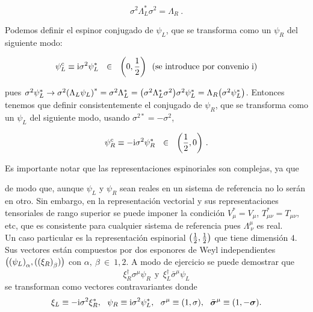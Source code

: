 \begin{equation}
    \sigma^{2}\Lambda_{L}^{*}\sigma^{2}=\Lambda_{R}~.
\end{equation}

Podemos definir el espinor conjugado de $\psi_{L}$, que se transforma como un $\psi_{R}$ del siguiente modo:

\begin{equation}
    \psi_{L}^{c} \equiv \mathrm{i} \sigma^{2}\psi_{L}^{*} ~~\in ~~\qty(0,\frac{1}{2}) ~~\text{(se introduce por convenio $\mathrm{i}$)}
\end{equation}

pues $\sigma^{2}\psi_{L}^{*} \to \sigma^{2}\qty(\Lambda_{L} \psi_{L})^{*} = \sigma^{2} \Lambda_{L}^{*}  = \qty(\sigma^{2} \Lambda_{L}^{*} \sigma^{2}) \sigma^{2} \psi_{L}^{*} =  \Lambda_{R}\qty( \sigma^{2} \psi_{L}^{*})$. Entonces tenemos que definir consistentemente el conjugado de $\psi_R$, que se transforma como un $\psi_{L}$ del siguiente modo, usando $\sigma^{2*}=-\sigma^{2}$,

\begin{equation}
    \psi_{R}^{c} \equiv -\mathrm{i} \sigma^{2} \psi^{*}_{R}~~\in ~~\qty(\frac{1}{2},0)~.
\end{equation}

Es importante notar que las representaciones espinoriales son complejas, ya que

de modo que, aunque $\psi_L$ y $\psi_{R}$ sean reales en un sistema de referencia no lo serán en otro. Sin embargo, en la representación vectorial y sus representaciones tensoriales de rango superior se puede imponer la condición $V_{\mu}^{*} = V_{\mu}$, $T_{\mu \nu}^{*} = T_{\mu \nu}$, etc, que es consistente para cualquier sistema de referencia pues $\Lambda^{\mu}_{~\nu}$ es real.\\

Un caso particular es la representación espinorial $\qty(\frac{1}{2},\frac{1}{2})$ que tiene dimensión $4$. Sus vectores están compuestos por dos esponores de Weyl independientes $\qty\big(\qty(\psi_{L})_{\alpha},(\qty(\xi_{R})_{\beta} ))$ con $\alpha,~\beta~ \in~{1,2}$. A modo de ejercicio se puede demostrar que 
\begin{equation*}
    \xi^{\dagger}_{R}\sigma^{\mu}\psi_{R}~~\text{y}~~\xi^{\dagger}_{L} \bar{\sigma}^{\mu}\psi_{L}
\end{equation*}
se transforman como vectores contravariantes donde 
\begin{equation}
    \xi_{L} \equiv -\mathrm{i} \sigma^{2} \xi_{R}^{*},~~\psi_{R} \equiv \mathrm{i} \sigma^{2}\psi_{L}^{*},~~\sigma^{\mu} \equiv \qty(1,\sigma),~~\bar{\vb*{\sigma}}^{\mu} \equiv \qty(1,-\vb*{\sigma}).
\end{equation}

